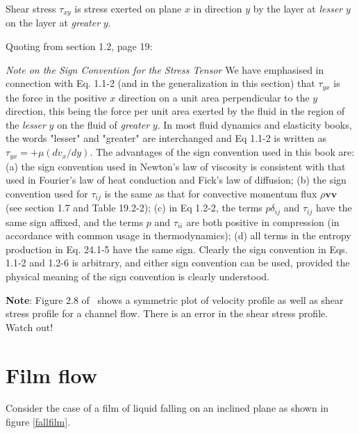 Shear stress $\tau_{xy}$ is stress exerted on plane $x$ in direction $y$ by the layer at {\em lesser} $y$ on the layer at {\em greater} $y$.

Quoting from \cite{bls} section 1.2, page 19:

\hspace{0.1\linewidth}\begin{minipage}[t]{0.8\linewidth}
{\em Note on the Sign Convention for the Stress Tensor} We have emphasised in connection with Eq. 1.1-2 (and in the generalization in this section) that $\tau_{yx}$ is the force in the positive $x$ direction on a unit area perpendicular to the $y$ direction, this being the force per unit area exerted by the fluid in the region of the {\it lesser} $y$ on the fluid of {\it greater} $y$. In most fluid dynamics and elasticity books, the words "lesser" and "greater" are interchanged and Eq 1.1-2 is written as $\tau_{yx} = +\mu(dv_x/dy)$. The advantages of the sign convention used in this book are: (a) the sign convention used in Newton's law of viscosity is consistent with that used in Fourier's law of heat conduction and Fick's law of diffusion; (b) the  sign convention used for $\tau_{ij}$ is the same as that for convective momentum flux $\rho \mathbf{v} \mathbf{v}$ (see section 1.7 and Table 19.2-2); (c) in Eq 1.2-2, the terms $p\delta_{ij}$ and $\tau_{ij}$ have the same sign affixed, and the terms $p$ and $\tau_{ii}$ are both positive in compression (in accordance with common usage in thermodynamics); (d) all terms in the entropy production in Eq. 24.1-5 have the same sign. Clearly the sign convention in Eqs. 1.1-2 and 1.2-6 is arbitrary, and either sign convention can be used, provided the physical meaning of the sign convention is clearly understood.
\end{minipage}

{\bf Note}: Figure 2.8 of~\cite{gaskell} shows a symmetric plot of velocity profile as well as shear stress profile for a channel flow. There is an error in the shear stress profile. Watch out!


\section{Film flow}

Consider the case of a film of liquid falling on an inclined plane as shown in figure \ref{fallfilm}.

